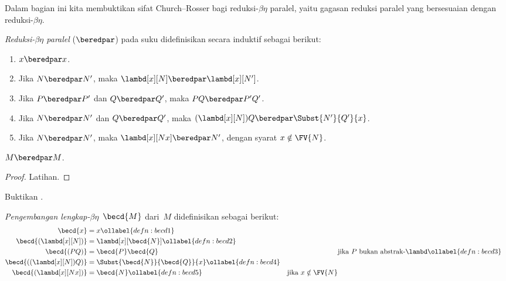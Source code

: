 \documentclass[../../../include/open-logic-section]{subfiles}
\begin{document}


Dalam bagian ini kita membuktikan sifat Church--Rosser bagi
reduksi-$\beta\eta$ paralel, yaitu gagasan reduksi paralel yang bersesuaian
dengan reduksi-$\beta\eta$.

\begin{defn} 
  \emph{Reduksi-$\beta\eta$ paralel} ($\beredpar$) pada suku didefinisikan
  secara induktif sebagai berikut:
  \begin{enumerate}
    \item {} $x \beredpar x$.
    \item {} Jika $N \beredpar N'$, maka
      $\lambd[x][N]\beredpar\lambd[x][N']$.
    \item {} Jika $P\beredpar P'$ dan $Q\beredpar Q'$,
      maka $PQ\beredpar P'Q'$.
    \item {} Jika $N\beredpar N'$ dan $Q\beredpar Q'$,
      maka $(\lambd[x][N])Q\beredpar\Subst{N'}{Q'}{x}$.
    \item {} Jika $N\beredpar N'$, maka
      $\lambd[x][Nx]\beredpar N'$, dengan syarat $x\notin\FV{N}$.
  \end{enumerate}
\end{defn}

\begin{thm}
  $M \beredpar M$.
\end{thm}

\begin{proof}
  Latihan.
\end{proof}

\begin{prob}
  Buktikan .
\end{prob}

\begin{defn}
  \emph{Pengembangan lengkap-$\beta\eta$}~$\becd{M}$ dari~$M$ didefinisikan
  sebagai berikut:
  \begin{align}
    \becd{x} &= x \ollabel{defn:becd1} \\
    \becd{(\lambd[x][N])} &= \lambd[x][\becd{N}] \ollabel{defn:becd2}\\
    \becd{(PQ)} &= \becd{P}\becd{Q} && \text{jika $P$ bukan abstrak-$\lambd$}
    \ollabel{defn:becd3} \\
    \becd{((\lambd[x][N])Q)} &= \Subst{\becd{N}}{\becd{Q}}{x}
                             \ollabel{defn:becd4} \\
    \becd{(\lambd[x][Nx])} &= \becd{N} \ollabel{defn:becd5} &
    \text{jika $x\notin\FV{N}$}
  \end{align}
\end{defn}
\end{document}
